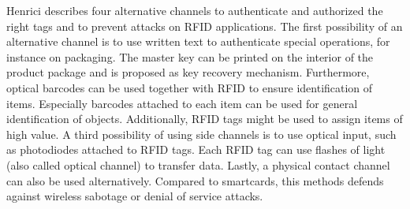 Henrici \cite[p.121 ff.]{henrici} describes four alternative channels to authenticate and authorized the right tags and to prevent attacks on RFID applications. 
The first possibility of an alternative channel is to use written text to authenticate special operations, for instance on packaging. The master key can be printed on the interior of the product package and is proposed as key recovery mechanism.
Furthermore, optical barcodes can be used together with RFID to ensure identification of items. Especially barcodes attached to each item can be used for general identification of objects. Additionally, RFID tags might be used to assign items of high value.
A third possibility of using side channels is to use optical input, such as photodiodes attached to RFID tags. Each RFID tag can use flashes of light (also called optical channel) to transfer data.   
Lastly, a physical contact channel can also be used alternatively. Compared to smartcards, this methods defends against wireless sabotage or denial of service attacks.


















 
